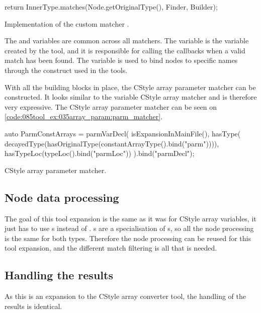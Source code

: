 \begin{listing}[H]
    \begin{cppcode}
return InnerType.matches(Node.getOriginalType(), Finder, Builder);
    \end{cppcode}
    \caption{Implementation of the custom matcher .}
    \label{code:085tool_ex:035array_param:match_impl}
\end{listing}

The  and  variables are common across all matchers. The  variable is the  variable created by the tool, and it is responsible for calling the callbacks when a valid match has been found. The  variable is used to bind nodes to specific names through the  construct used in the tools.

With all the building blocks in place, the CStyle array parameter matcher can be constructed. It looks similar to the variable CStyle array matcher and is therefore very expressive. The CStyle array parameter matcher can be seen on \cref{code:085tool_ex:035array_param:parm_matcher}.

\begin{listing}[H]
    \begin{cppcode}
auto ParmConstArrays = parmVarDecl(
        isExpansionInMainFile(),
        hasType(
            decayedType(hasOriginalType(constantArrayType().bind("parm")))),
        hasTypeLoc(typeLoc().bind("parmLoc")) 
    ).bind("parmDecl");
    \end{cppcode}
    \caption{CStyle array parameter matcher.}
    \label{code:085tool_ex:035array_param:parm_matcher}
\end{listing}

\subsection{Node data processing}

The goal of this tool expansion is the same as it was for CStyle array variables, it just has to use s instead of . s are a specialisation of s, so all the node processing is the same for both types. Therefore the node processing can be reused for this tool expansion, and the different match filtering is all that is needed.

\subsection{Handling the results}

As this is an expansion to the CStyle array converter tool, the handling of the results is identical.